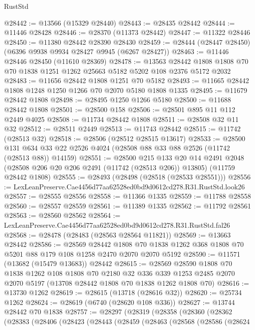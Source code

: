 \begin{lexlean}{RustStd}
\begin{coremodule}
@28442 := @13566 (@15329 @28440)
@28443 := @28435 @28442
@28444 := @11446 @28428
@28446 := @28370 (@11373 @28442)
@28447 := @11322 @28446
@28450 := @11380 @28442 @28390 @28430
@28459 := @28444 (@28447 @28450) (@6396 @9938 @9934 @28427 @9945 (@6267 @28427))
@28463 := @11446 @28446 @28450 (@11610 @28369)
@28478 := @13563
    @28442
    @1808
    @1808
    @70
    @70
    @1838
    @1251
    @1262
    @25663
    @5182
    @5202
    @108
    @2376
    @5172
    @2032
@28483 := @11656 @28442 @1808 @1251 @70 @5182
@28493 := @11665 @28442 @1808 @1248 @1250 @1266 @70 @2070 @5180 @1808 @1335
@28495 := @11679 @28442 @1808
@28498 := @28495 @1250 @1266 @5180
@28500 := @11688 @28442 @1808
@28501 := @28500 @158
@28506 := @28501 @895 @11 @112 @2449 @4025
@28508 := @11734 @28442 @1808
@28511 := @28508 @32 @11 @32
@28512 := @28511 @2449
@28513 := @11743 @28442
@28515 := @11742 (@28513 @32)
@28518 := @28506 (@28512 @28515 @13617)
@28533 := @28500
    @131
    @634
    @33
    @22
    @2526
    @4024
    (@28508 @88 @33 @88 @2526 (@11742 (@28513 @88)) @14159)
@28551 := @28500
    @215
    @133
    @20
    @14
    @2491
    @2048
    (@28508 @206 @20 @206 @2491 (@11742 (@28513 @206)) @13805)
    (@11759 @28442 @1808)
@28555 := @28493 (@28498 (@28518 (@28533 @28551)))
@28556 := LexLeanPreserve.Cae4456d77aa62528ed0bd9d0612cd278.R31.RustStd.look26
@28557 := @28555 @28556
@28558 := @11366 @1335
@28559 := @11788 @28558
@28560 := @28557 @28559
@28561 := @11389 @1335
@28562 := @11792 @28561
@28563 := @28560 @28562
@28564 := LexLeanPreserve.Cae4456d77aa62528ed0bd9d0612cd278.R31.RustStd.fal26
@28568 := @28478 (@28483 (@28563 @28564 @11821))
@28569 := @13663 @28442
@28586 := @28569
    @28442
    @1808
    @70
    @1838
    @1262
    @368
    @1808
    @70
    @5201
    @88
    @179
    @108
    @1258
    @2470
    @2070
    @2070
    @5192
@28590 := @11571 (@13682 (@15479 @13683)) @28442
@28615 := @28569
    @28590
    @1808
    @70
    @1838
    @1262
    @108
    @1808
    @70
    @2180
    @32
    @336
    @339
    @1253
    @2485
    @2070
    @2070
    @5197
    (@13708 @28442 @1808 @70 @1838 @1262 @1808 @70)
@28616 := @13730 @1262
@28619 := @28615 (@13718 (@28616 @32))
@28620 := @25734 @1262
@28624 := @28619 (@6740 (@28620 @108 @336))
@28627 := @13744 @28442 @70 @1838
@28757 := @28297
    (@28319
      (@28358
        (@28360
          (@28362
            (@28383
              (@28406
                (@28423
                  (@28443
                    (@28459
                      (@28463
                        (@28568
                          (@28586
                            (@28624

\end{coremodule}
\end{lexlean}
